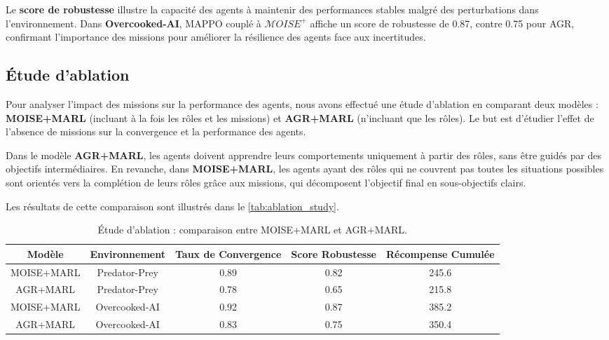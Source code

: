 \documentclass[sigconf,anonymous]{aamas}
\begin{document}
Le \textbf{score de robustesse} illustre la capacité des agents à maintenir des performances stables malgré des perturbations dans l'environnement. Dans \textbf{Overcooked-AI}, MAPPO couplé à $\mathcal{M}OISE^+$ affiche un score de robustesse de 0.87, contre 0.75 pour AGR, confirmant l'importance des missions pour améliorer la résilience des agents face aux incertitudes.

\subsection{Étude d'ablation}

Pour analyser l'impact des missions sur la performance des agents, nous avons effectué une étude d'ablation en comparant deux modèles : \textbf{MOISE+MARL} (incluant à la fois les rôles et les missions) et \textbf{AGR+MARL} (n'incluant que les rôles). Le but est d'étudier l'effet de l'absence de missions sur la convergence et la performance des agents.

Dans le modèle \textbf{AGR+MARL}, les agents doivent apprendre leurs comportements uniquement à partir des rôles, sans être guidés par des objectifs intermédiaires. En revanche, dans \textbf{MOISE+MARL}, les agents ayant des rôles qui ne couvrent pas toutes les situations possibles sont orientés vers la complétion de leurs rôles grâce aux missions, qui décomposent l'objectif final en sous-objectifs clairs.

Les résultats de cette comparaison sont illustrés dans le \autoref{tab:ablation_study}.

\begin{table*}[h!]
    \centering
    \caption{Étude d'ablation : comparaison entre MOISE+MARL et AGR+MARL.}
    \label{tab:ablation_study}
    \begin{tabular}{|c|c|c|c|c|}
        \hline
        \textbf{Modèle} & \textbf{Environnement} & \textbf{Taux de Convergence} & \textbf{Score Robustesse} & \textbf{Récompense Cumulée} \\ \hline
        MOISE+MARL & Predator-Prey & 0.89 & 0.82 & 245.6 \\ \hline
        AGR+MARL & Predator-Prey & 0.78 & 0.65 & 215.8 \\ \hline
        MOISE+MARL & Overcooked-AI & 0.92 & 0.87 & 385.2 \\ \hline
        AGR+MARL & Overcooked-AI & 0.83 & 0.75 & 350.4 \\ \hline
    \end{tabular}
\end{table*}
\end{document}
